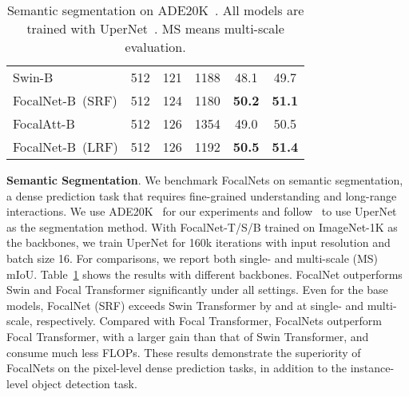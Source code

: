 \documentclass{article}
\begin{document}
\begin{table}[t]
\begin{minipage}{0.4\linewidth}
{\begin{tabular}{l|ccccc}
    Swin-B~\cite{liu2021swin} & 512 & 121 & 1188 & 48.1 & 49.7  \\    
    \rowcolor{Gray}    
    FocalNet-B~(SRF) & 512 & 124 & 1180 & \textbf{50.2} & \textbf{51.1} \\    
    FocalAtt-B~\cite{yang2021focal} & 512 & 126 & 1354 & 49.0 & 50.5 \\  
    \rowcolor{Gray}    
    FocalNet-B~(LRF) & 512 & 126 & 1192 & \textbf{50.5} & \textbf{51.4} \\    
\bottomrule
\end{tabular} 
  }
  \captionsetup{font=footnotesize}    
  \caption{Semantic segmentation on ADE20K~\cite{zhou2017scene}. All models are trained with UperNet~\cite{xiao2018unified}. MS means multi-scale evaluation.}
  \label{tab:semantic_segmentation}
  \end{minipage} 
\vspace{-5mm}
\end{table}

\textbf{Semantic Segmentation}. We benchmark FocalNets on semantic segmentation, a dense prediction task that requires fine-grained understanding and long-range interactions. We use ADE20K~\cite{zhou2017scene} for our experiments and follow~\cite{liu2021swin} to use UperNet~\cite{xiao2018unified} as the segmentation method. With FocalNet-T/S/B trained on ImageNet-1K as the backbones, we train UperNet for 160k iterations with input resolution  and batch size 16. For comparisons, we report both single- and multi-scale (MS) mIoU. Table~\ref{tab:semantic_segmentation} shows the results with different backbones. FocalNet outperforms Swin and Focal Transformer significantly under all settings. Even for the base models,  FocalNet (SRF) exceeds Swin Transformer by  and  at single- and multi-scale, respectively. 
Compared with Focal Transformer, FocalNets outperform Focal Transformer, with a larger gain than that of Swin Transformer, and consume much less FLOPs. These results demonstrate the superiority of FocalNets on the pixel-level dense prediction tasks, in addition to the instance-level object detection task.
\end{document}
